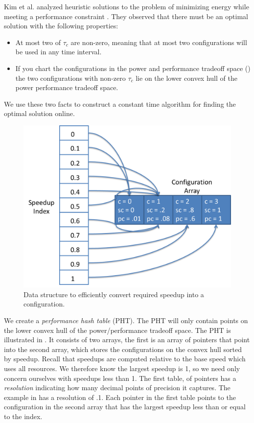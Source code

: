 Kim et al. analyzed heuristic solutions to the problem of minimizing
energy while meeting a performance constraint \cite{kim-cpsna}.  They
observed that there must be an optimal solution with the following
properties:
\begin{itemize}
\item At most two of $\tau_c$ are non-zero, meaning that at most two
  configurations will be used in any time interval.
\item If you chart the configurations in the power and performance
  tradeoff space () the two configurations with
  non-zero $\tau_c$ lie on the lower convex hull of the power
  performance tradeoff space.
\end{itemize}
We use these two facts to construct a constant time algorithm for
finding the optimal solution online.  


\begin{figure}
\includegraphics[width=\columnwidth]{figures/SpeedupHashTable.png}
\caption{Data structure to efficiently convert required speedup into a
  configuration.}
  \label{fig:pht}
\end{figure}



We create a \emph{performance hash table} (PHT).  The PHT will only
contain points on the lower convex hull of the power/performance
tradeoff space.  The PHT is illustrated in .  It consists
of two arrays, the first is an array of pointers that point into the
second array, which stores the configurations on the convex hull
sorted by speedup.  Recall that speedups are computed relative to the
base speed which uses all resources.  We therefore know the largest
speedup is 1, so we need only concern ourselves with speedups less
than 1.  The first table, of pointers has a \emph{resolution}
indicating how many decimal points of precision it captures.  The
example in  has a resolution of .1.  Each pointer in the
first table points to the configuration in the second array that has
the largest speedup less than or equal to the index.

